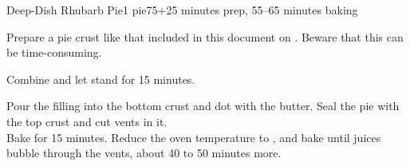 \documentclass[../Cookbook.tex]{subfiles}
\begin{document}
\begin{recipe}{Deep-Dish Rhubarb Pie}{1 pie}{75+25 minutes prep, 55--65 minutes baking}

	Prepare a pie crust like that included in this document on . Beware that this can be time-consuming.

	\newstep

	Combine and let stand for 15 minutes.

	Pour the filling into the bottom crust and dot with the butter. Seal the pie with the top crust and cut vents in it.\\
	Bake for 15 minutes.
	Reduce the oven temperature to , and bake until juices bubble through the vents, about 40 to 50 minutes more.

\end{recipe}
\end{document}
